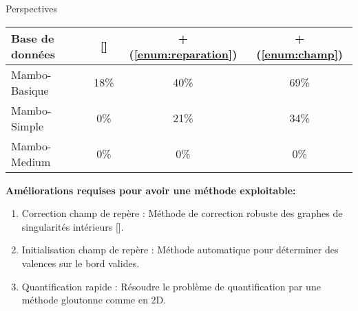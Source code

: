 \begin{frame}{Perspectives}
    \begin{table}
        \centering
        \begin{tabular}{|l|c|c|c|}
        \hline
        Base de données & [\cite{ray_practical_2016}] & + (\ref{enum:reparation}) & + (\ref{enum:champ}) \\
        \hline
        Mambo-Basique & 18\% & 40\% & 69\% \\
        \hline
        Mambo-Simple & 0\% & 21\% & 34\% \\
        \hline
        Mambo-Medium & 0\% & 0\% & 0\% \\
        \hline
        \end{tabular}
    \end{table}
    \textbf{Améliorations requises pour avoir une méthode exploitable:}
    \begin{enumerate}
        \item Correction champ de repère : Méthode de correction robuste des graphes de singularités intérieurs [\cite{liu2023locally}].
        \item Initialisation champ de repère : Méthode automatique pour déterminer des valences sur le bord valides.
        \item Quantification rapide : Résoudre le problème de quantification par une méthode gloutonne comme en 2D.
    \end{enumerate}
\end{frame}